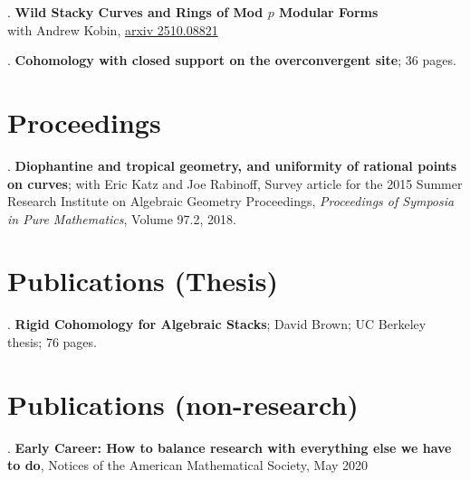 \documentclass[margin,line]{res}
\newcounter{pubs}
\begin{document}
\begin{resume}
 .  \textbf{Wild Stacky Curves and Rings of Mod $p$ Modular Forms}\\
with Andrew Kobin, \href{http://arxiv.org/abs/2510.08821}{arxiv 2510.08821}



 .  \textbf{Cohomology with closed support on the overconvergent site}; 36 pages. \vspace{.48cm}\\

\vspace{-7pt}
\section{\sc Proceedings }
 . \textbf{Diophantine and tropical geometry, and uniformity of   rational points on curves}; with Eric Katz and Joe Rabinoff, Survey article for the 2015 Summer Research Institute on Algebraic Geometry Proceedings, \emph{Proceedings of Symposia in Pure Mathematics}, Volume 97.2, 2018. \vspace{.08cm}\\



\section{\sc Publications {(Thesis)}}
 . \textbf{Rigid Cohomology for Algebraic Stacks}; David Brown; UC Berkeley thesis; 76 pages. \vspace{.08cm}\\




\section{\sc Publications (non-research)}
 . \textbf{Early Career: How to balance research with everything else we have to do}, Notices of the American Mathematical Society, May 2020




\end{resume}
\end{document}
